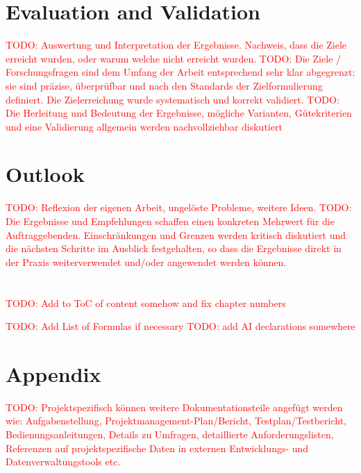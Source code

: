 \documentclass[a4paper,12pt,listof=numbered,toc=chapterentrywithdots]{scrreport}
\renewcommand{\todo}[1]{\textcolor{red}{TODO: #1}}
\begin{document}
	\chapter{Evaluation and Validation}
		\todo{Auswertung und Interpretation der Ergebnisse. Nachweis, dass die Ziele erreicht wurden, oder warum	welche nicht erreicht wurden.}
		\todo{Die Ziele / Forschungsfragen sind dem Umfang der Arbeit entsprechend sehr klar abgegrenzt; sie sind präzise, überprüfbar und nach den Standards der Zielformulierung definiert. Die Zielerreichung wurde systematisch und korrekt validiert.}
		\todo{Die Herleitung und Bedeutung der Ergebnisse, mögliche Varianten, Gütekriterien und eine Validierung allgemein werden nachvollziehbar diskutiert}
	
	\chapter{Outlook}
		\todo{Reflexion der eigenen Arbeit, ungelöste Probleme, weitere Ideen.}
		\todo{Die Ergebnisse und Empfehlungen schaffen einen konkreten Mehrwert für die Auftraggebenden. Einschränkungen und Grenzen werden kritisch diskutiert und die nächsten Schritte im Ausblick festgehalten, so dass die Ergebnisse direkt in der Praxis weiterverwendet und/oder angewendet werden können.}
	
	\chapter{\glossaryname}
	\printglossary[title={}]


	\todo{Add to ToC of content somehow and fix chapter numbers}
	

	\listoffigures
	
	\listoftables
	\todo{Add List of Formulas if necessary}
	\todo{add AI declarations somewhere}
	
	
	\chapter{\bibname}
	\printbibliography[heading=none]

	
	\appendix
	\chapter{Appendix}
		\todo{Projektspezifisch können weitere Dokumentationsteile angefügt werden wie: Aufgabenstellung, Projektmanagement-Plan/Bericht, Testplan/Testbericht, Bedienungsanleitungen, Details zu Umfragen, detaillierte Anforderungslisten, Referenzen auf projektspezifische Daten in externen Entwicklungs- und Datenverwaltungstools etc.}
	
\end{document}
